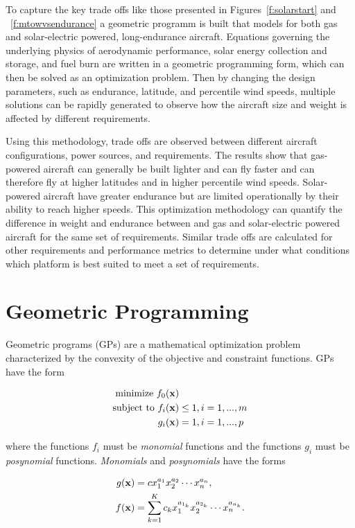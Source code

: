 \documentclass[]{aiaa-tc}%
\begin{document}
To capture the key trade offs like those presented in Figures~\ref{f:solarstart} and ~\ref{f:mtowvsendurance} a geometric programm is built that models for both gas and solar-electric powered, long-endurance aircraft.  
Equations governing the underlying physics of aerodynamic performance, solar energy collection and storage, and fuel burn are written in a geometric programming form, which can then be solved as an optimization problem.
Then by changing the design parameters, such as endurance, latitude, and percentile wind speeds, multiple solutions can be rapidly generated to observe how the aircraft size and weight is affected by different requirements. 

Using this methodology, trade offs are observed between different aircraft configurations, power sources, and requirements.  
The results show that gas-powered aircraft can generally be built lighter and can fly faster and can therefore fly at higher latitudes and in higher percentile wind speeds.  
Solar-powered aircraft have greater endurance but are limited operationally by their ability to reach higher speeds.  
This optimization methodology can quantify the difference in weight and endurance between and gas and solar-electric powered aircraft for the same set of requirements. 
Similar trade offs are calculated for other requirements and performance metrics to determine under what conditions which platform is best suited to meet a set of requirements.

\section{Geometric Programming\cite{gp}}

Geometric programs (GPs) are a mathematical optimization problem characterized by the convexity of the objective and constraint functions. GPs have the form

\begin{align} 
\label{e:gpform}
\text{minimize } f_0(\bold{x}) & \nonumber \\
\text{subject to  } f_i(\bold{x}) &\leq 1, i=1,...,m \\
g_i (\bold{x}) &= 1, i = 1,...,p \nonumber 
\end{align}

where the functions $f_i$ must be \emph{monomial} functions and the functions $g_i$ must be \emph{posynomial} functions. \emph{Monomials} and \emph{posynomials} have the forms

\begin{align}
 \label{e:mon}
g(\bold{x}) &= c x_1^{a_1} x_2^{a_2} \dotsm x_n^{a_n} , \\
\label{e:pos}
f(\bold{x}) &= \displaystyle\sum_{k=1}^K c_k x_1^{a_{1_k}} x_2^{a_{2_k}} \dotsm x_n^{a_{n_k}}.
\end{align}
\end{document}
